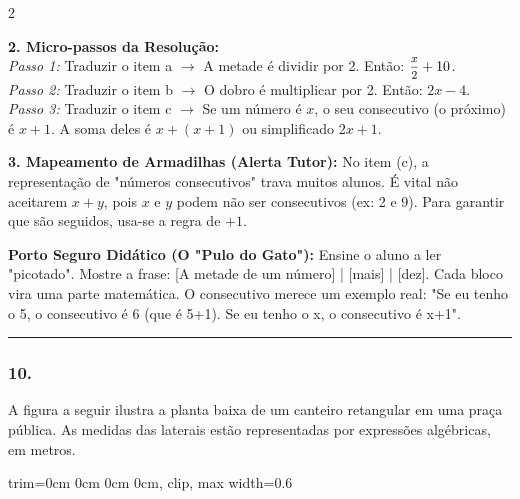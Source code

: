 \begin{multicols*}{2}
\begin{tcolorbox}[colback=CorTitUm!5, colframe=CorTitUm, boxrule=1pt, arc=4pt, left=6pt, right=6pt, top=6pt, bottom=6pt]
    \textbf{2. Micro-passos da Resolução:}\\
    \textit{Passo 1:} Traduzir o item a $\rightarrow$ A metade é dividir por 2. Então: $ \mfrac{x}{2} + 10 $.\\
    \textit{Passo 2:} Traduzir o item b $\rightarrow$ O dobro é multiplicar por 2. Então: $ 2x - 4 $.\\
    \textit{Passo 3:} Traduzir o item c $\rightarrow$ Se um número é $x$, o seu consecutivo (o próximo) é $x+1$. A soma deles é $ x + (x + 1) $ ou simplificado $ 2x + 1 $.\par\vspace{0.1cm}
    
    \textbf{3. Mapeamento de Armadilhas (Alerta Tutor):} No item (c), a representação de "números consecutivos" trava muitos alunos. É vital não aceitarem $x+y$, pois $x$ e $y$ podem não ser consecutivos (ex: 2 e 9). Para garantir que são seguidos, usa-se a regra de $+1$.
    \end{tcolorbox}
    \vspace{0.15cm}
    
    \begin{boxexplicacao}
    \textbf{Porto Seguro Didático (O "Pulo do Gato"):} Ensine o aluno a ler "picotado". Mostre a frase: [A metade de um número] | [mais] | [dez]. Cada bloco vira uma parte matemática. O consecutivo merece um exemplo real: "Se eu tenho o 5, o consecutivo é 6 (que é 5+1). Se eu tenho o x, o consecutivo é x+1".
    \end{boxexplicacao}
\fi

\par\vspace{\espacoQuestao}

\noindent\textcolor{CorLinha}{\rule{\linewidth}{0.5pt}} 
\par\vspace{\espacoPreQuestao}
\subsubsection*{10.} 
\begin{enunciadoLiteral}
A figura a seguir ilustra a planta baixa de um canteiro retangular em uma praça pública. As medidas das laterais estão representadas por expressões algébricas, em metros.

\begin{center}
\begin{adjustbox}{trim=0cm 0cm 0cm 0cm, clip, max width=0.6\linewidth}
\end{adjustbox}
\end{center}
\end{enunciadoLiteral}
\end{multicols*}
